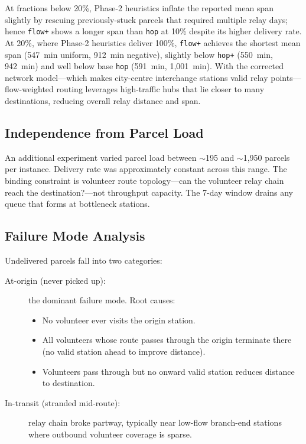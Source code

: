 \documentclass[11pt,a4paper]{article}
\begin{document}
At fractions below 20\%, Phase-2 heuristics inflate the reported mean span
slightly by rescuing previously-stuck parcels that required multiple relay
days; hence \texttt{flow+} shows a longer span than \texttt{hop} at 10\%
despite its higher delivery rate. At 20\%, where Phase-2 heuristics
deliver 100\%, \texttt{flow+} achieves the shortest mean span (547~min
uniform, 912~min negative), slightly below \texttt{hop+} (550~min, 942~min)
and well below base \texttt{hop} (591~min, 1{,}001~min). With the corrected
network model---which makes city-centre interchange stations valid relay
points---flow-weighted routing leverages high-traffic hubs that lie closer
to many destinations, reducing overall relay distance and span.

\subsection{Independence from Parcel Load}

An additional experiment varied parcel load between $\sim$195 and
$\sim$1{,}950 parcels per instance. Delivery rate was approximately constant
across this range. The binding constraint is volunteer route topology---can
the volunteer relay chain reach the destination?---not throughput capacity.
The 7-day window drains any queue that forms at bottleneck stations.

\subsection{Failure Mode Analysis}

Undelivered parcels fall into two categories:
\begin{description}
  \item[At-origin (never picked up):] the dominant failure mode. Root causes:
    \begin{itemize}
      \item No volunteer ever visits the origin station.
      \item All volunteers whose route passes through the origin terminate
            there (no valid station ahead to improve distance).
      \item Volunteers pass through but no onward valid station reduces
            distance to destination.
    \end{itemize}
  \item[In-transit (stranded mid-route):] relay chain broke partway, typically
        near low-flow branch-end stations where outbound volunteer coverage
        is sparse.
\end{description}
\end{document}
